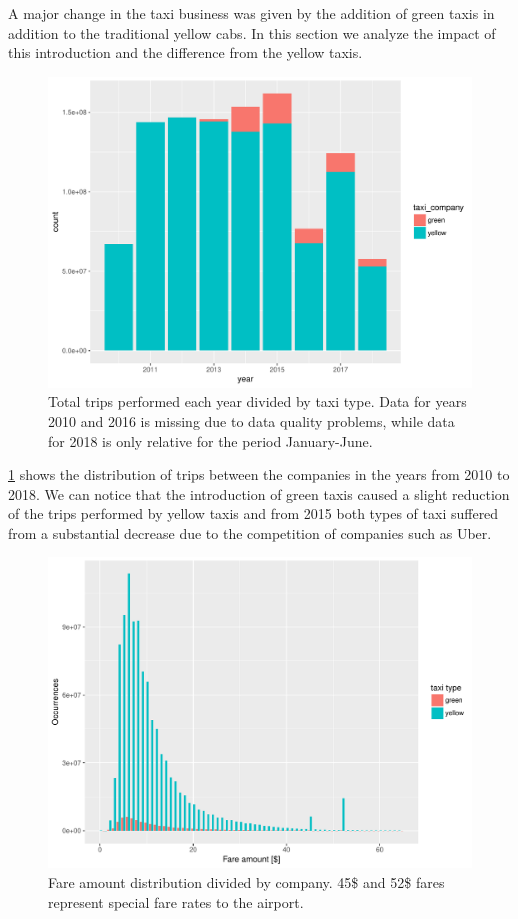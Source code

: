 \documentclass{acm_proc_article-sp-sigmod09}
\begin{document}
A major change in the taxi business was given by the addition of green taxis in addition to the traditional yellow cabs. In this section we analyze the impact of this introduction and the difference from the yellow taxis.

\begin{figure}
	\centering
	\includegraphics[width=1\columnwidth]{resources/base_plots/travels_by_year_and_company.pdf}
	\caption{Total trips performed each year divided by taxi type. Data for years 2010 and 2016 is missing due to data quality problems, while data for 2018 is only relative for the period January-June.}
	\label{fig:travelsByYearAndCompany}
\end{figure}

\cref{fig:travelsByYearAndCompany} shows the distribution of trips between the companies in the years from 2010 to 2018. We can notice that the introduction of green taxis caused a slight reduction of the trips performed by yellow taxis and from 2015 both types of taxi suffered from a substantial decrease due to the competition of companies such as Uber.

\begin{figure}
	\centering
	\includegraphics[width=1\columnwidth]{resources/base_plots/fare_amount_by_company_distr.pdf}
	\caption{Fare amount distribution divided by company. 45\$ and 52\$ fares represent special fare rates to the airport.}
	\label{fig:fareAmountByCompany}
\end{figure}
\end{document}
